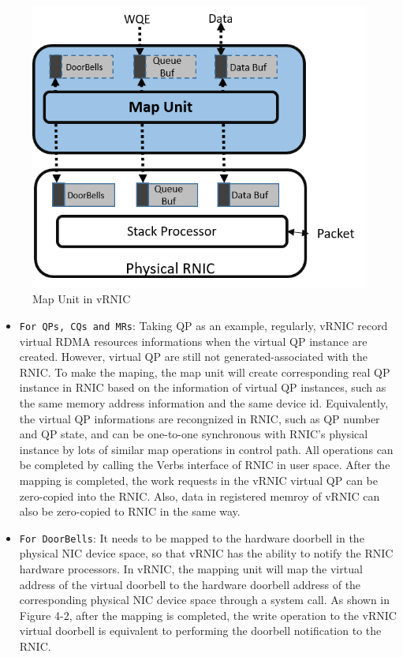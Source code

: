 \begin{figure}[!ht]
	\centering
	\includegraphics[width=1.0\linewidth]{images/map-unit}
	\caption{Map Unit in vRNIC}
	\label{fig:map-unit}
\end{figure}

\begin{itemize}
\item {\verb|For QPs, CQs and MRs|}: Taking QP as an example, regularly, vRNIC record virtual RDMA resources informations when the virtual QP instance are created. However, virtual QP are still not generated-associated with the RNIC. To make the maping, the map unit will create corresponding real QP instance in RNIC based on the information of virtual QP instances, such as the same memory address information and the same device id. Equivalently, the virtual QP informations are recongnized in RNIC, such as QP number and QP state, and can be one-to-one synchronous with RNIC's  physical instance by lots of similar map operations in control path. All operations can be completed by calling the Verbs interface of RNIC in user space. After the mapping is completed, the work requests in the vRNIC virtual QP can be zero-copied into the RNIC. Also, data in registered memroy of vRNIC can also be zero-copied to RNIC in the same way. 
\item {\verb|For DoorBells|}: It needs to be mapped to the hardware doorbell in the physical NIC device space, so that vRNIC has the ability to notify the RNIC hardware processors. In vRNIC, the mapping unit will map the virtual address of the virtual doorbell to the hardware doorbell address of the corresponding physical NIC device space through a system call. As shown in Figure 4-2, after the mapping is completed, the write operation to the vRNIC virtual doorbell is equivalent to performing the doorbell notification to the RNIC.
\end{itemize}

